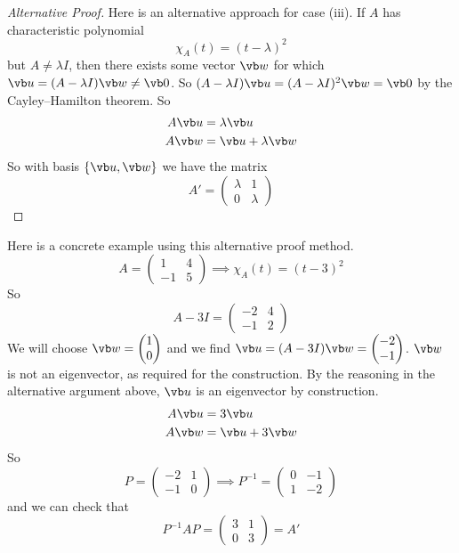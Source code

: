 \begin{proof}[Alternative Proof]
	Here is an alternative approach for case (iii).
	If \(A\) has characteristic polynomial
	\[
		\chi_A(t) = (t - \lambda)^2
	\]
	but \(A \neq \lambda I\), then there exists some vector \(\vb w\) for which \(\vb u = (A - \lambda I)\vb w \neq \vb 0\).
	So \((A - \lambda I)\vb u = (A - \lambda I)^2 \vb w  = \vb 0\) by the Cayley--Hamilton theorem.
	So
	\begin{align*}
		A\vb u & = \lambda \vb u         \\
		A\vb w & = \vb u + \lambda \vb w
	\end{align*}
	So with basis \(\{ \vb u, \vb w \}\) we have the matrix
	\[
		A' = \begin{pmatrix}
			\lambda & 1       \\
			0       & \lambda
		\end{pmatrix}
	\]
\end{proof}
Here is a concrete example using this alternative proof method.
\[
	A = \begin{pmatrix}
		1 & 4 \\ -1 & 5
	\end{pmatrix} \implies \chi_A(t) = (t - 3)^2
\]
So
\[
	A - 3I = \begin{pmatrix}
		-2 & 4 \\ -1 & 2
	\end{pmatrix}
\]
We will choose \(\vb w = \begin{pmatrix}
	1 \\ 0
\end{pmatrix}\) and we find \(\vb u = (A - 3I)\vb w = \begin{pmatrix}
	-2 \\ -1
\end{pmatrix}\).
\(\vb w\) is not an eigenvector, as required for the construction.
By the reasoning in the alternative argument above, \(\vb u\) is an eigenvector by construction.
\begin{align*}
	A\vb u & = 3\vb u         \\
	A\vb w & = \vb u + 3\vb w
\end{align*}
So
\[
	P = \begin{pmatrix}
		-2 & 1 \\ -1 & 0
	\end{pmatrix} \implies P^{-1} = \begin{pmatrix}
		0 & -1 \\ 1 & -2
	\end{pmatrix}
\]
and we can check that
\[
	P^{-1}AP = \begin{pmatrix}
		3 & 1 \\ 0 & 3
	\end{pmatrix} = A'
\]

